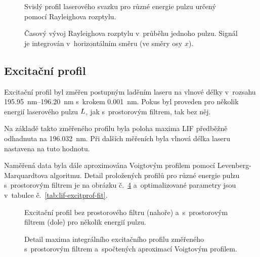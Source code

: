 \begin{figure}
	\centering
	
	\caption{Svislý profil laserového svazku pro různé energie pulzu
		určený pomocí Rayleighova rozptylu.}
	\label{fig:lif-rayleigh-profile}
\end{figure}

\begin{figure}
	\centerline{}
	\caption{Časový vývoj Rayleighova rozptylu v~průběhu jednoho pulzu.
		Signál je integrován v~horizontálním směru (ve směry osy $x$).}
	\label{fig:lif-rayleigh-time}
\end{figure}

\subsection{Excitační profil}
\label{sec:lif-excitprof}
Excitační profil byl změřen postupným laděním laseru na vlnové délky
v~rozsahu \SIrange{195.95}{196.20}{\nano\metre}
s~krokem \SI{0.001}{\nano\metre}.
Pokus byl proveden pro několik energií laserového pulzu $L$,
jak s~prostorovým filtrem, tak bez něj.

Na základě takto změřeného profilu byla poloha maxima LIF předběžně
odhadnuta na \SI{196.032}{\nano\metre}.
Při dalších měřeních byla vlnová délka laseru na\-stavena na tuto hodnotu.

Naměřená data byla dále aproximována Voigtovým profilem pomocí
Le\-ven\-berg-Marquardtova algoritmu.
Detail proložených profilů pro různé energie pulzu s~prostorovým filtrem
je na obrázku č.~\ref{fig:lif-excitprof-fit}
a~optimalizované parametry jsou v~tabulce č.~\ref{tab:lif-excitprof-fit}.

\begin{figure}
	\centering
	
	\bigskip\par
	
	\caption{Excitační profil bez prostorového filtru (nahoře)
		a~s~prostorovým filtrem (dole) pro několik energií pulzu.}
	\label{fig:lif-excitprof-filter}
\end{figure}

\begin{figure}
	\centering
	
	\caption{Detail maxima integrálního excitačního profilu
		změřeného s~prostorovým filtrem
		a~spočtených aproximací Voigtovým profilem.}
	\label{fig:lif-excitprof-fit}
\end{figure}

